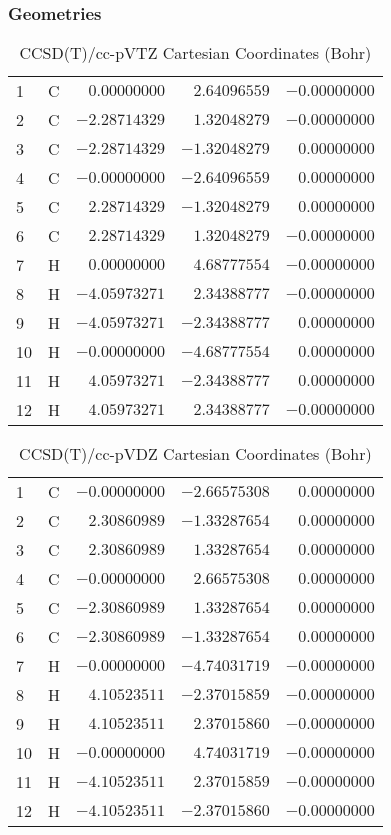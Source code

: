 \documentclass[10pt,oneside]{article}
\begin{document}
\subsubsection*{Geometries}
\begin{table}[h!]
\centering
\caption{CCSD(T)/cc-pVTZ Cartesian Coordinates (Bohr)}
\begin{tabular}{llrrr}
1  & C  & $ 0.00000000$ & $ 2.64096559$ & $-0.00000000$ \\
2  & C  & $-2.28714329$ & $ 1.32048279$ & $-0.00000000$ \\
3  & C  & $-2.28714329$ & $-1.32048279$ & $ 0.00000000$ \\
4  & C  & $-0.00000000$ & $-2.64096559$ & $ 0.00000000$ \\
5  & C  & $ 2.28714329$ & $-1.32048279$ & $ 0.00000000$ \\
6  & C  & $ 2.28714329$ & $ 1.32048279$ & $-0.00000000$ \\
7  & H  & $ 0.00000000$ & $ 4.68777554$ & $-0.00000000$ \\
8  & H  & $-4.05973271$ & $ 2.34388777$ & $-0.00000000$ \\
9  & H  & $-4.05973271$ & $-2.34388777$ & $ 0.00000000$ \\
10 & H  & $-0.00000000$ & $-4.68777554$ & $ 0.00000000$ \\
11 & H  & $ 4.05973271$ & $-2.34388777$ & $ 0.00000000$ \\
12 & H  & $ 4.05973271$ & $ 2.34388777$ & $-0.00000000$ \\
\end{tabular}
\end{table}

\begin{table}[h!]
\centering
\caption{CCSD(T)/cc-pVDZ Cartesian Coordinates (Bohr)}
\begin{tabular}{llrrr}
1  & C  & $-0.00000000$ & $-2.66575308$ & $ 0.00000000$ \\
2  & C  & $ 2.30860989$ & $-1.33287654$ & $ 0.00000000$ \\
3  & C  & $ 2.30860989$ & $ 1.33287654$ & $ 0.00000000$ \\
4  & C  & $-0.00000000$ & $ 2.66575308$ & $ 0.00000000$ \\
5  & C  & $-2.30860989$ & $ 1.33287654$ & $ 0.00000000$ \\
6  & C  & $-2.30860989$ & $-1.33287654$ & $ 0.00000000$ \\
7  & H  & $-0.00000000$ & $-4.74031719$ & $-0.00000000$ \\
8  & H  & $ 4.10523511$ & $-2.37015859$ & $-0.00000000$ \\
9  & H  & $ 4.10523511$ & $ 2.37015860$ & $-0.00000000$ \\
10 & H  & $-0.00000000$ & $ 4.74031719$ & $-0.00000000$ \\
11 & H  & $-4.10523511$ & $ 2.37015859$ & $-0.00000000$ \\
12 & H  & $-4.10523511$ & $-2.37015860$ & $-0.00000000$ \\
\end{tabular}
\end{table}
\end{document}
